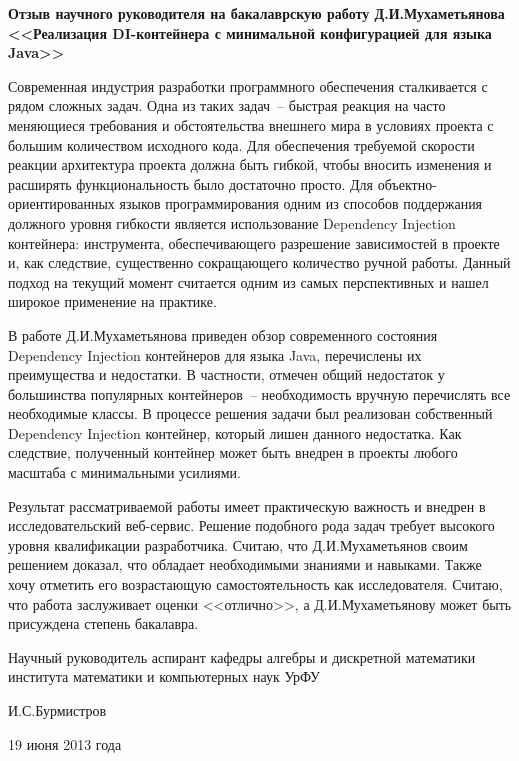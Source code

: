 \documentclass[12pt]{article}
\begin{document}
\begin{center}
\small{\textbf{Отзыв научного руководителя \linebreak
на бакалаврскую работу Д.И.Мухаметьянова}} \linebreak
\large{\textbf{<<Реализация DI-контейнера с минимальной конфигурацией для языка Java>>}}
\end{center}

Современная индустрия разработки программного обеспечения сталкивается с рядом сложных задач.
Одна из таких задач~-- быстрая реакция на часто меняющиеся требования и обстоятельства внешнего мира в условиях проекта
с большим количеством исходного кода. Для обеспечения требуемой скорости реакции архитектура проекта должна быть 
гибкой, чтобы вносить изменения и расширять функциональность было достаточно просто. 
Для объектно-ориентированных языков программирования одним из способов поддержания должного уровня гибкости является использование Dependency Injection контейнера:
инструмента, обеспечивающего разрешение зависимостей в проекте и, как следствие, существенно сокращающего количество ручной работы. 
Данный подход на текущий момент считается одним из самых перспективных и нашел широкое применение на практике.

В работе Д.И.Мухаметьянова приведен обзор современного состояния Dependency Injection контейнеров для языка Java, перечислены их преимущества и недостатки.
В частности, отмечен общий недостаток у большинства популярных контейнеров~-- необходимость вручную перечислять все необходимые классы. 
В процессе решения задачи был реализован собственный Dependency Injection контейнер, который лишен данного недостатка. 
Как следствие, полученный контейнер может быть внедрен в проекты любого масштаба с минимальными усилиями.

Результат рассматриваемой работы имеет практическую важность и внедрен в исследовательский веб-сервис. Решение подобного рода задач требует высокого уровня
квалификации разработчика. Считаю, что Д.И.Мухаметьянов своим решением доказал, что обладает необходимыми знаниями и навыками. 
Также хочу отметить его возрастающую самостоятельность как исследователя. Считаю, что работа заслуживает оценки <<отлично>>, а Д.И.Мухаметьянову может быть присуждена
степень бакалавра.

\begin{flushleft}
Научный руководитель \linebreak
аспирант кафедры алгебры и дискретной математики \linebreak
института математики и компьютерных наук УрФУ \linebreak
\end{flushleft}

\begin{flushright}
И.С.Бурмистров
\end{flushright}

\begin{flushleft}
19 июня 2013 года
\end{flushleft} 
\end{document}
